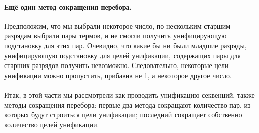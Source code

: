 \documentclass{cw1}
\begin{document}
\paragraph{Ещё один метод сокращения перебора.}
Предположим, что мы выбрали некоторое число, по нескольким старшим разрядам выбрали пары термов,
и не смогли получить унифицирующую подстановку для этих пар. Очевидно, что какие бы ни были младшие
разряды, унифицирующую подстановку для целей унификации, содержащих пары для старших
разрядов получить
невозможно. Следовательно, некоторые цели унификации можно пропустить, прибавив не 1, а некоторое
другое число.
\paragraph{}
Итак, в этой части мы рассмотрели как проводить унификацию секвенций, также методы
сокращения перебора: первые два метода сокращают количество пар, из которых будут строиться
цели унификации; последний сокращает собственно количество целей унификации. 
\end{document}
